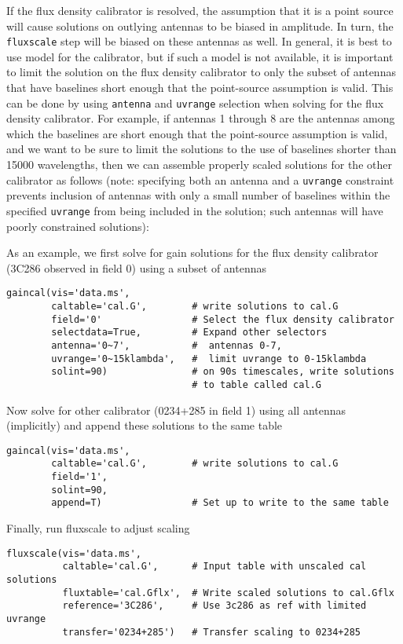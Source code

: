 If the flux density calibrator is resolved, the assumption that it is
a point source will cause solutions on outlying antennas to be biased
in amplitude.  In turn, the {\tt fluxscale} step will be biased
on these antennas as well.  In general, it is best to use 
model for the calibrator, but if such a model is not available,
it is important to limit the solution on the flux density calibrator
to only the subset of antennas that have baselines short enough that
the point-source assumption is valid.  This can be done by using
{\tt antenna} and {\tt uvrange} selection when solving for the flux density
calibrator.  For example, if antennas 1 through 8 are the antennas
among which the baselines are short enough that the point-source
assumption is valid, and we want to be sure to limit the solutions to
the use of baselines shorter than 15000 wavelengths, then we can
assemble properly scaled solutions for the other calibrator as follows
(note: specifying both an antenna and a {\tt uvrange} constraint prevents
inclusion of antennas with only a small number of baselines within the
specified {\tt uvrange} from being included in the solution; such antennas
will have poorly constrained solutions):

As an example, we first solve for gain solutions for the flux density
calibrator (3C286 observed in field 0) using a subset of antennas
\small
\begin{verbatim}
gaincal(vis='data.ms',
        caltable='cal.G',        # write solutions to cal.G
        field='0'                # Select the flux density calibrator
        selectdata=True,         # Expand other selectors
        antenna='0~7',           #  antennas 0-7,
        uvrange='0~15klambda',   #  limit uvrange to 0-15klambda
        solint=90)               # on 90s timescales, write solutions
                                 # to table called cal.G
\end{verbatim}
\normalsize
Now solve for other calibrator (0234+285 in field 1) using all antennas
(implicitly) and append these solutions to the same table
\small
\begin{verbatim}
gaincal(vis='data.ms',
        caltable='cal.G',        # write solutions to cal.G
        field='1',
        solint=90,
        append=T)                # Set up to write to the same table
\end{verbatim}
\normalsize
Finally, run fluxscale to adjust scaling
\small
\begin{verbatim}
fluxscale(vis='data.ms',
          caltable='cal.G',      # Input table with unscaled cal solutions
          fluxtable='cal.Gflx',  # Write scaled solutions to cal.Gflx
          reference='3C286',     # Use 3c286 as ref with limited uvrange
          transfer='0234+285')   # Transfer scaling to 0234+285
\end{verbatim}
\normalsize

